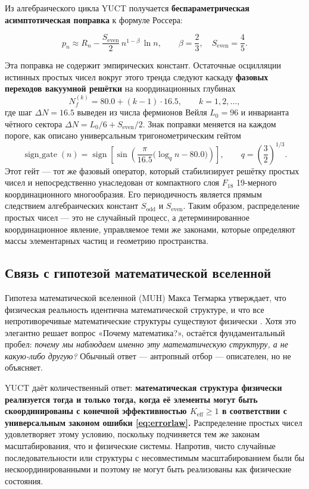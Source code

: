 \documentclass[12pt]{article}
\begin{document}
	Из алгебраического цикла YUCT получается \textbf{беспараметрическая асимптотическая поправка} к формуле Россера:
	
	\begin{equation}
		\boxed{ p_n \approx R_n - \frac{S_{\mathrm{even}}}{2}\, n^{1-\beta}\,\ln n },
		\qquad \beta = \frac{2}{3},\quad S_{\mathrm{even}}=\frac{4}{5}.
		\label{eq:prime-yuct-theory}
	\end{equation}
	
	Эта поправка не содержит эмпирических констант. Остаточные осцилляции истинных простых чисел вокруг этого тренда следуют каскаду \textbf{фазовых переходов вакуумной решётки} на координационных глубинах
	\[
	N_f^{(k)} = 80.0 + (k-1)\cdot 16.5, \qquad k=1,2,\dots,
	\]
	где шаг \(\Delta N = 16.5\) выведен из числа фермионов Вейля \(L_0=96\) и инварианта чётного сектора \(\Delta N = L_0/6 + S_{\mathrm{even}}/2\). Знак поправки меняется на каждом пороге, как описано универсальным тригонометрическим гейтом
	\[
	\operatorname{sign\_gate}(n) = \operatorname{sign}\!\left[\sin\!\left(\frac{\pi}{16.5}\bigl(\log_q n - 80.0\bigr)\right)\right],
	\qquad q = \left(\frac{3}{2}\right)^{1/3}.
	\]
	Этот гейт — тот же фазовый оператор, который стабилизирует решётку простых чисел и непосредственно унаследован от компактного слоя \(F_{18}\) 19-мерного координационного многообразия. Его периодичность является прямым следствием алгебраических констант \(S_{\mathrm{odd}}\) и \(S_{\mathrm{even}}\). Таким образом, распределение простых чисел — это не случайный процесс, а детерминированное координационное явление, управляемое теми же законами, которые определяют массы элементарных частиц и геометрию пространства.
	
	\subsection{Связь с гипотезой математической вселенной}
	
	Гипотеза математической вселенной (MUH) Макса Тегмарка утверждает, что физическая реальность идентична математической структуре, и что все непротиворечивые математические структуры существуют физически \cite{Tegmark2014}. Хотя это элегантно решает вопрос «Почему математика?», остаётся фундаментальный пробел: \emph{почему мы наблюдаем именно эту математическую структуру, а не какую-либо другую?} Обычный ответ — антропный отбор — описателен, но не объясняет.
	
	YUCT даёт количественный ответ: \textbf{математическая структура физически реализуется тогда и только тогда, когда её элементы могут быть скоординированы с конечной эффективностью \(K_{\mathrm{eff}} \ge 1\) в соответствии с универсальным законом ошибки \eqref{eq:errorlaw}.} Распределение простых чисел удовлетворяет этому условию, поскольку подчиняется тем же законам масштабирования, что и физические системы. Напротив, чисто случайные последовательности или структуры с несовместимым масштабированием были бы нескоординированными и поэтому не могут быть реализованы как физические состояния.
	
\end{document}
